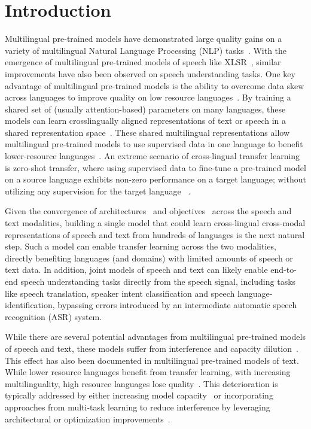 \documentclass[nohyperref]{article}
\begin{document}
\section{Introduction}
\label{sec:introduction}
Multilingual pre-trained models have demonstrated large quality gains on a variety of multilingual Natural Language Processing (NLP) tasks~\citep{hu2020xtreme,ruder2021xtreme}. With the emergence of multilingual pre-trained models of speech like XLSR~\citep{conneau2020unsupervised,babu2021xls}, similar improvements have also been observed on speech understanding tasks. One key advantage of multilingual pre-trained models is the ability to overcome data skew across languages to improve quality on low resource languages~\citep{arivazhagan2019massively}. By training a shared set of (usually attention-based) parameters on many languages, these models can learn crosslingually aligned representations of text or speech in a shared representation space~\citep{kudugunta2019investigating,wu2019emerging}. These shared multilingual representations allow multilingual pre-trained models to use supervised data in one language to benefit lower-resource languages~\citep{conneau2019cross}. An extreme scenario of cross-lingual transfer learning is zero-shot transfer, where using supervised data to fine-tune a pre-trained model on a source language exhibits non-zero performance on a target language; without utilizing any supervision for the target language
~\cite{johnson2017google,conneau2018xnli}.

Given the convergence of architectures~\citep{vaswani2017attention} and objectives~\citep{devlin2019bert,baevski2020wav2vec,chung2021w2v} across the speech and text modalities, building a single model that could learn cross-lingual cross-modal representations of speech and text from hundreds of languages is the next natural step. Such a model can enable transfer learning across the two modalities, directly benefiting languages (and domains) with limited amounts of speech or text data. In addition, joint models of speech and text can likely enable end-to-end speech understanding tasks directly from the speech signal, including tasks like speech translation, speaker intent classification and speech language-identification, bypassing errors introduced by an intermediate automatic speech recognition (ASR) system.


While there are several potential advantages from multilingual pre-trained models of speech and text, these models suffer from interference and capacity dilution~\citep{bapna2021slam}. This effect has also been documented in multilingual pre-trained models of text. While lower resource languages benefit from transfer learning, with increasing multilinguality, high resource languages lose quality~\citep{Caruana1997,arivazhagan2019massively,conneau2019unsupervised}. This deterioration is typically addressed by either increasing model capacity~\citep{arivazhagan2019massively,babu2021xls} or incorporating approaches from multi-task learning to reduce interference by leveraging architectural or optimization improvements~\cite{wang2020gradient,raffel2019exploring}. 
\end{document}
